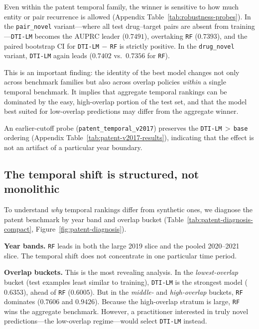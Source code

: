 \documentclass[referee,pdflatex,sn-basic,Numbered]{sn-jnl}
\newcommand{\AUPRC}{AUPRC}
\begin{document}
Even within the patent temporal family, the winner is sensitive to how much entity or pair recurrence is allowed (Appendix Table~\ref{tab:robustness-probes}). In the \texttt{pair\_novel} variant—where all test drug--target pairs are absent from training—\texttt{DTI-LM} becomes the \AUPRC{} leader ($0.7491$), overtaking \texttt{RF} ($0.7393$), and the paired bootstrap CI for \texttt{DTI-LM}$\,-\,$\texttt{RF} is strictly positive. In the \texttt{drug\_novel} variant, \texttt{DTI-LM} again leads ($0.7402$ vs.\ $0.7356$ for \texttt{RF}).

This is an important finding: the identity of the best model changes not only across benchmark families but also across overlap policies \emph{within} a single temporal benchmark. It implies that aggregate temporal rankings can be dominated by the easy, high-overlap portion of the test set, and that the model best suited for low-overlap predictions may differ from the aggregate winner.

An earlier-cutoff probe (\texttt{patent\_temporal\_v2017}) preserves the \texttt{DTI-LM}$\,>\,$\texttt{base} ordering (Appendix Table~\ref{tab:patent-v2017-results}), indicating that the effect is not an artifact of a particular year boundary.

\subsection{The temporal shift is structured, not monolithic}

To understand \emph{why} temporal rankings differ from synthetic ones, we diagnose the patent benchmark by year band and overlap bucket (Table~\ref{tab:patent-diagnosis-compact}, Figure~\ref{fig:patent-diagnosis}).

\textbf{Year bands.} \texttt{RF} leads in both the large 2019 slice and the pooled 2020--2021 slice. The temporal shift does not concentrate in one particular time period.

\textbf{Overlap buckets.} This is the most revealing analysis. In the \emph{lowest-overlap} bucket (test examples least similar to training), \texttt{DTI-LM} is the strongest model ($0.6353$), ahead of \texttt{RF} ($0.6005$). But in the \emph{middle-} and \emph{high-overlap} buckets, \texttt{RF} dominates ($0.7606$ and $0.9426$). Because the high-overlap stratum is large, \texttt{RF} wins the aggregate benchmark. However, a practitioner interested in truly novel predictions—the low-overlap regime—would select \texttt{DTI-LM} instead.
\end{document}
